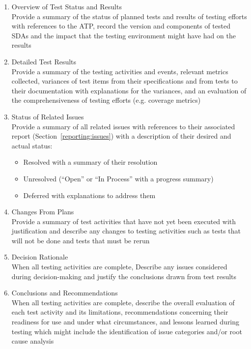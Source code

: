 \begin{enumerate}
\begin{enumerate}
        \item Overview of Test Status and Results \\
        Provide a summary of the status of planned tests and results of testing
        efforts with references to the ATP, record the version and components
        of tested SDAs and the impact that the testing environment might have
        had on the results

        \item Detailed Test Results \\
        Provide a summary of the testing activities and events, relevant
        metrics collected, variances of test items from their specifications
        and from tests to their documentation with explanations for the
        variances, and an evaluation of the comprehensiveness of testing
        efforts (e.g. coverage metrics)

        \item Status of Related Issues \\
        Provide a summary of all related issues with references to their
        associated report (Section~\ref{reporting:issues}) with a description
        of their desired and actual status:
        \begin{itemize}
            \item Resolved with a summary of their resolution
            \item Unresolved (``Open'' or ``In Process'' with a progress
            summary)
            \item Deferred with explanations to address them
        \end{itemize}

        \clearpage

        \item Changes From Plans \\
        Provide a summary of test activities that have not yet been executed
        with justification and describe any changes to testing activities such
        as tests that will not be done and tests that must be rerun

        \item Decision Rationale \\
        When all testing activities are complete, Describe any issues
        considered during decision-making and justify the conclusions drawn
        from test results

        \item Conclusions and Recommendations \\
        When all testing activities are complete, describe the overall
        evaluation of each test activity and its limitations, recommendations
        concerning their readiness for use and under what circumstances, and
        lessons learned during testing which might include the identification
        of issue categories and/or root cause analysis

    \end{enumerate}

\end{enumerate}
